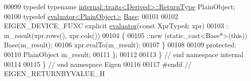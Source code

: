 \begin{DoxyCode}
00099   \textcolor{keyword}{typedef} \textcolor{keyword}{typename} \hyperlink{struct_eigen_1_1internal_1_1traits}{internal::traits<Derived>::ReturnType} PlainObject;
00100   \textcolor{keyword}{typedef} \hyperlink{struct_eigen_1_1internal_1_1evaluator}{evaluator<PlainObject>} \hyperlink{struct_eigen_1_1internal_1_1evaluator}{Base};
00101   
00102   EIGEN\_DEVICE\_FUNC \textcolor{keyword}{explicit} \hyperlink{struct_eigen_1_1internal_1_1evaluator}{evaluator}(\textcolor{keyword}{const} XprType& xpr)
00103     : m\_result(xpr.rows(), xpr.cols())
00104   \{
00105     ::new (static\_cast<Base*>(\textcolor{keyword}{this})) Base(m\_result);
00106     xpr.evalTo(m\_result);
00107   \}
00108 
00109 \textcolor{keyword}{protected}:
00110   PlainObject m\_result;
00111 \};
00112 
00113 \} \textcolor{comment}{// end namespace internal}
00114 
00115 \} \textcolor{comment}{// end namespace Eigen}
00116 
00117 \textcolor{preprocessor}{#endif // EIGEN\_RETURNBYVALUE\_H}
\end{DoxyCode}
